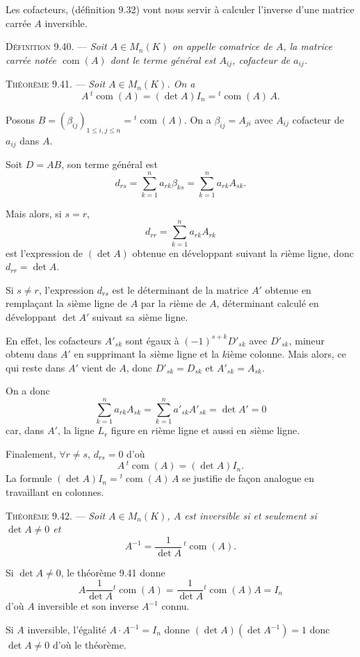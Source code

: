 Les cofacteurs, (définition 9.32) vont nous servir à calculer l'inverse d'une matrice carrée $A$ inversible.

\medskip\noindent\textsc{Définition 9.40.} --- \emph{Soit $A\in M_n(K)$ on appelle comatrice de $A$, la matrice carrée notée $\operatorname{com}(A)$ dont le terme général est $A_{ij}$, cofacteur de $a_{ij}$.}

\medskip\noindent\textsc{Théorème 9.41.} --- \emph{Soit $A\in M_n(K)$. On a}
\[
A\,{}^t\!\operatorname{com}(A)=(\det A)I_n={}^t\!\operatorname{com}(A)\,A.
\]

Posons $B=(\beta_{ij})_{1\le i,j\le n}={}^t\!\operatorname{com}(A)$. On a $\beta_{ij}=A_{ji}$ avec $A_{ij}$ cofacteur de $a_{ij}$ dans $A$.

Soit $D=AB$, son terme général est
\[
d_{rs}=\sum_{k=1}^n a_{rk}\beta_{ks}=\sum_{k=1}^n a_{rk}A_{sk}.
\]

Mais alors, si $s=r$,
\[
d_{rr}=\sum_{k=1}^n a_{rk}A_{rk}
\]
est l'expression de $(\det A)$ obtenue en développant suivant la $r$ième ligne, donc $d_{rr}=\det A$.

Si $s\ne r$, l'expression $d_{rs}$ est le déterminant de la matrice $A'$ obtenue en remplaçant la $s$ième ligne de $A$ par la $r$ième de $A$, déterminant calculé en développant $\det A'$ suivant sa $s$ième ligne.

En effet, les cofacteurs $A'_{sk}$ sont égaux à $(-1)^{s+k}D'_{sk}$ avec $D'_{sk}$, mineur obtenu dans $A'$ en supprimant la $s$ième ligne et la $k$ième colonne. Mais alors, ce qui reste dans $A'$ vient de $A$, donc $D'_{sk}=D_{sk}$ et $A'_{sk}=A_{sk}$.

On a donc
\[
\sum_{k=1}^n a_{rk}A_{sk}=\sum_{k=1}^n a'_{sk}A'_{sk}=\det A'=0
\]
car, dans $A'$, la ligne $L_r$ figure en $r$ième ligne et aussi en $s$ième ligne.

Finalement, $\forall r\ne s$, $d_{rs}=0$ d'où
\[
A\,{}^t\!\operatorname{com}(A)=(\det A)I_n.
\]
La formule $(\det A)I_n={}^t\!\operatorname{com}(A)\,A$ se justifie de façon analogue en travaillant en colonnes. \bookend

\medskip\noindent\textsc{Théorème 9.42.} --- \emph{Soit $A\in M_n(K)$, $A$ est inversible si et seulement si $\det A\ne0$ et}
\[
A^{-1}=\frac1{\det A}\,{}^t\!\operatorname{com}(A).
\]

Si $\det A\ne0$, le théorème 9.41 donne
\[
A\frac1{\det A}{}^t\!\operatorname{com}(A)
=\frac1{\det A}{}^t\!\operatorname{com}(A)A=I_n
\]
d'où $A$ inversible et son inverse $A^{-1}$ connu.

Si $A$ inversible, l'égalité $A\cdot A^{-1}=I_n$ donne $(\det A)(\det A^{-1})=1$ donc $\det A\ne0$ d'où le théorème. \bookend


